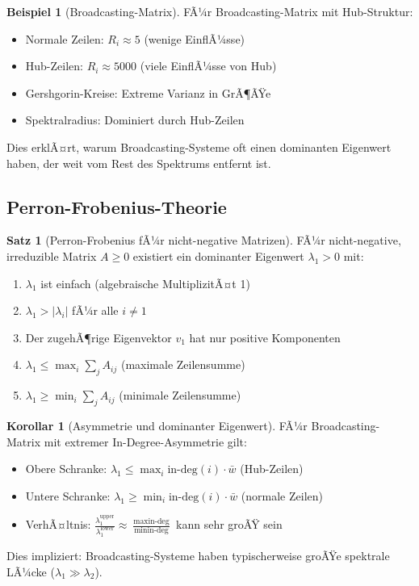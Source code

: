 ﻿\documentclass[a4paper,12pt]{report}
\theoremstyle{definition}
\newtheorem{beispiel}{Beispiel}
\newtheorem{satz}{Satz}
\newtheorem{korollar}{Korollar}
\begin{document}
	\begin{beispiel}[Broadcasting-Matrix]
		FÃ¼r Broadcasting-Matrix mit Hub-Struktur:
		\begin{itemize}
			\item Normale Zeilen: $R_i \approx 5$ (wenige EinflÃ¼sse)
			\item Hub-Zeilen: $R_i \approx 5000$ (viele EinflÃ¼sse von Hub)
			\item Gershgorin-Kreise: Extreme Varianz in GrÃ¶ÃŸe
			\item Spektralradius: Dominiert durch Hub-Zeilen
		\end{itemize}
		
		Dies erklÃ¤rt, warum Broadcasting-Systeme oft einen dominanten Eigenwert haben, der weit vom Rest des Spektrums entfernt ist.
	\end{beispiel}
	
	\subsection{Perron-Frobenius-Theorie}
	
	\begin{satz}[Perron-Frobenius fÃ¼r nicht-negative Matrizen]
		FÃ¼r nicht-negative, irreduzible Matrix $A \geq 0$ existiert ein dominanter Eigenwert $\lambda_1 > 0$ mit:
		\begin{enumerate}
			\item $\lambda_1$ ist einfach (algebraische MultiplizitÃ¤t 1)
			\item $\lambda_1 > |\lambda_i|$ fÃ¼r alle $i \neq 1$
			\item Der zugehÃ¶rige Eigenvektor $v_1$ hat nur positive Komponenten
			\item $\lambda_1 \leq \max_i \sum_j A_{ij}$ (maximale Zeilensumme)
			\item $\lambda_1 \geq \min_i \sum_j A_{ij}$ (minimale Zeilensumme)
		\end{enumerate}
	\end{satz}
	
	\begin{korollar}[Asymmetrie und dominanter Eigenwert]
		FÃ¼r Broadcasting-Matrix mit extremer In-Degree-Asymmetrie gilt:
		\begin{itemize}
			\item Obere Schranke: $\lambda_1 \leq \max_i \text{in-deg}(i) \cdot \bar{w}$ (Hub-Zeilen)
			\item Untere Schranke: $\lambda_1 \geq \min_i \text{in-deg}(i) \cdot \bar{w}$ (normale Zeilen)
			\item VerhÃ¤ltnis: $\frac{\lambda_1^{\text{upper}}}{\lambda_1^{\text{lower}}} \approx \frac{\max \text{in-deg}}{\min \text{in-deg}}$ kann sehr groÃŸ sein
		\end{itemize}
		
		Dies impliziert: Broadcasting-Systeme haben typischerweise groÃŸe spektrale LÃ¼cke ($\lambda_1 \gg \lambda_2$).
	\end{korollar}
	
\end{document}
